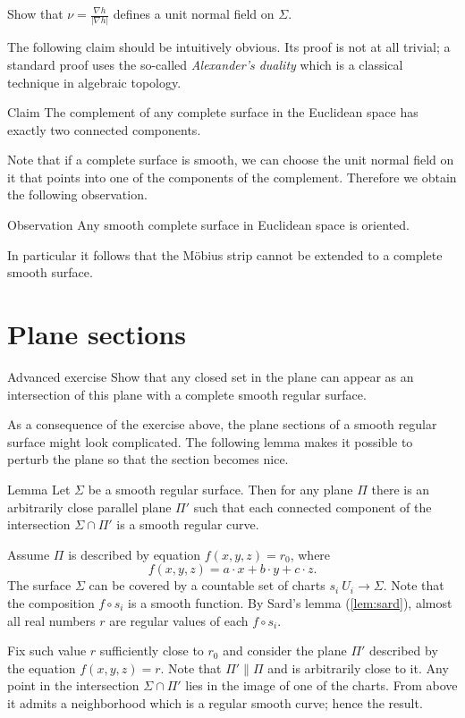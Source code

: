  Show that $\nu=\tfrac{\nabla h}{|\nabla h|}$ defines a unit normal field on $\Sigma$.

The following claim should be intuitively obvious. 
Its proof is not at all trivial; a standard proof uses the so-called \emph{Alexander's duality} which is a classical technique in algebraic topology.

\begin{thm}{Claim}
The complement of any complete surface in the Euclidean space has exactly two connected components. 
\end{thm}

Note that if a complete surface is smooth, we can choose the unit normal field on it that points into one of the components of the complement.
Therefore we obtain the following observation. 

\begin{thm}{Observation}
Any smooth complete surface in Euclidean space is oriented.
\end{thm}

In particular it follows that the M\"obius strip cannot be extended to a complete smooth surface.

\section*{Plane sections}

\begin{thm}{Advanced exercise}
Show that any closed set in the plane can appear as an intersection of this plane with a complete smooth regular surface.  
\end{thm}

As a consequence of the exercise above, the plane sections of a smooth regular surface might look complicated.
The following lemma makes it possible to perturb the plane so that the section becomes nice. 

\begin{thm}{Lemma}\label{lem:reg-section}
Let $\Sigma$ be a smooth regular surface.
Then for any plane $\Pi$ there is an arbitrarily close parallel plane $\Pi'$ such that 
each connected component of the intersection $\Sigma\cap \Pi'$ is a smooth regular curve.
\end{thm}

Assume $\Pi$ is described by equation $f(x,y,z)=r_0$, where
\[f(x,y,z)=a\cdot x+b\cdot y+c\cdot z.\] 
The surface $\Sigma$ can be covered by a countable set of charts $s_i\:U_i\to \Sigma$.
Note that the composition $f\circ s_i$ is a smooth function.
By Sard's lemma (\ref{lem:sard}), almost all real numbers $r$ are regular values of each $f\circ s_i$.

Fix such value $r$ sufficiently close to $r_0$ and consider the plane $\Pi'$ described by the equation $f(x,y,z)=r$.
Note that $\Pi'\parallel \Pi$ and is arbitrarily close to it.
Any point in the intersection $\Sigma\cap\Pi'$ lies in the image of one of the charts.
From above it admits a neighborhood which is a regular smooth curve;
hence the result.\qeds


